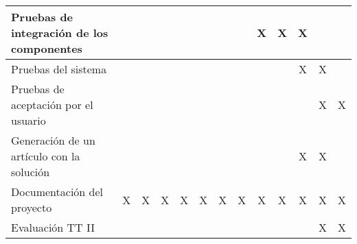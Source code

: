 \begin{longtable}{|p{2.5cm}|c|c|c|c|c|c|c|c|c|c|c|c|}
	Pruebas de integración de los componentes &  &  &  &  &  &  &  & X & X & X & & \\ \hline
	Pruebas del sistema &  &  &  &  &  &  &  &  &  & X & X & \\ \hline
	Pruebas de aceptación por el usuario &  &  &  &  &  &  &  &  &  &  & X & X \\ \hline
	Generación de un artículo con la solución &  &  &  &  &  &  &  &  &  & X & X & \\ \hline
	Documentación del proyecto & X & X & X & X & X & X & X & X & X & X & X & X \\ \hline
	Evaluación TT II &  &  &  &  &  &  &  &  &  &  & X & X\\ \hline
\end{longtable}